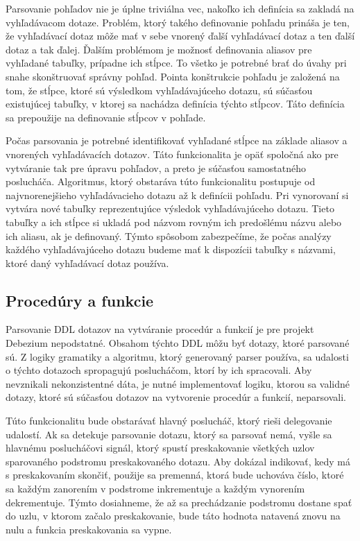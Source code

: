 Parsovanie pohľadov nie je úplne triviálna vec, nakoľko ich definícia sa zakladá na vyhľadávacom dotaze. Problém, ktorý takého definovanie pohľadu prináša je ten, že vyhľadávací dotaz môže mať v sebe vnorený ďalší vyhľadávací dotaz a ten ďalší dotaz a tak ďalej. Ďalším problémom je možnosť definovania aliasov pre vyhľadané tabuľky, prípadne ich stĺpce. To všetko je potrebné brať do úvahy pri snahe skonštruovať správny pohľad. Pointa konštrukcie pohľadu je založená na tom, že stĺpce, ktoré sú výsledkom vyhľadávajúceho dotazu, sú súčasťou existujúcej tabuľky, v ktorej sa nachádza definícia týchto stĺpcov. Táto definícia sa prepoužije na definovanie stĺpcov v pohľade. 

Počas parsovania je potrebné identifikovať vyhľadané stĺpce na základe aliasov a vnorených vyhľadávacích dotazov. Táto funkcionalita je opäť spoločná ako pre vytváranie tak pre úpravu pohľadov, a preto je súčasťou samostatného poslucháča. Algoritmus, ktorý obstaráva túto funkcionalitu postupuje od najvnorenejšieho vyhľadávacieho dotazu až k definícii pohľadu. Pri vynorovaní si vytvára nové tabuľky reprezentujúce výsledok vyhľadávajúceho dotazu. Tieto tabuľky a ich stĺpce si ukladá pod názvom rovným ich predošlému názvu alebo ich aliasu, ak je definovaný. Týmto spôsobom zabezpečíme, že počas analýzy každého vyhľadávajúceho dotazu budeme mať k dispozícii tabuľky s názvami, ktoré daný vyhľadávací dotaz používa.

\subsection{Procedúry a funkcie}
Parsovanie DDL dotazov na vytváranie procedúr a funkcií je pre projekt Debezium nepodstatné. Obsahom týchto DDL môžu byť dotazy, ktoré parsované sú. Z logiky gramatiky a algoritmu, ktorý generovaný parser používa, sa udalosti o týchto dotazoch spropagujú poslucháčom, ktorí by ich spracovali. Aby nevznikali nekonzistentné dáta, je nutné implementovať logiku, ktorou sa validné dotazy, ktoré sú súčasťou dotazov na vytvorenie procedúr a funkcií, neparsovali.

Túto funkcionalitu bude obstarávať hlavný poslucháč, ktorý rieši delegovanie udalostí. Ak sa detekuje parsovanie dotazu, ktorý sa parsovať nemá, vyšle sa hlavnému poslucháčovi signál, ktorý spustí preskakovanie všetkých uzlov sparovaného podstromu preskakovaného dotazu. Aby dokázal indikovať, kedy má s preskakovaním skončiť, použije sa premenná, ktorá bude uchováva číslo, ktoré sa každým zanorením v podstrome inkrementuje a každým vynorením dekrementuje. Týmto dosiahneme, že až sa prechádzanie podstromu dostane spať do uzlu, v ktorom začalo preskakovanie, bude táto hodnota natavená znovu na nulu a funkcia preskakovania sa vypne.

